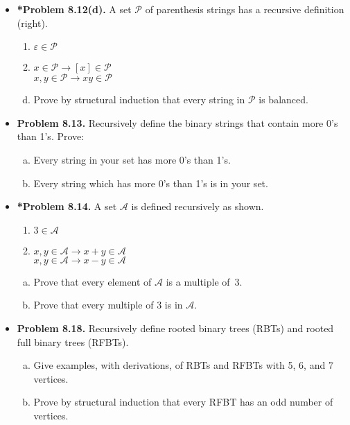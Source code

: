 \documentclass[11pt]{article}
\def\imp{\rightarrow}
\begin{document}
\begin{itemize}
\vspace{0.1in}

\item \textbf{*Problem 8.12(d).}
A set $\mathcal{P}$ of parenthesis strings has a recursive definition (right).
\begin{enumerate}[(1)]
\item $\varepsilon\in\mathcal{P}$
\item $x\in\mathcal{P}\imp [x]\in\mathcal{P}$ \\
  $x,y\in\mathcal{P}\imp xy\in\mathcal{P}$
\end{enumerate}
\begin{enumerate}[(a)]
\setcounter{enumi}{3}
\item Prove by structural induction that every string in $\mathcal{P}$ is balanced.
\end{enumerate}

\vspace{0.1in}

\item \textbf{Problem 8.13.}
Recursively define the binary strings that contain more 0's than 1's.
Prove:
\begin{enumerate}[(a)]
\item Every string in your set has more 0's than 1's.
\item Every string which has more 0's than 1's is in your set.
\end{enumerate}

\vspace{0.1in}

\item \textbf{*Problem 8.14.}
A set $\mathcal{A}$ is defined recursively as shown.
\begin{enumerate}[(1)]
\item $3\in\mathcal{A}$
\item $x,y\in\mathcal{A}\imp x+y\in\mathcal{A}$ \\
  $x,y\in\mathcal{A}\imp x-y\in\mathcal{A}$
\end{enumerate}
\begin{enumerate}[(a)]
\item Prove that every element of $\mathcal{A}$ is a multiple of~3.
\item Prove that every multiple of 3 is in $\mathcal{A}$.
\end{enumerate}

\vspace{0.1in}

\item \textbf{Problem 8.18.}
Recursively define rooted binary trees (RBTs) and rooted full binary trees (RFBTs).
\begin{enumerate}[(a)]
\item Give examples, with derivations, of RBTs and RFBTs with 5, 6, and 7 vertices.
\item Prove by structural induction that every RFBT has an odd number of vertices.
\end{enumerate}

\end{itemize}
\end{document}
